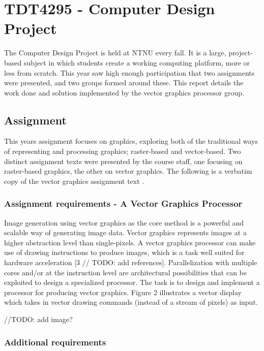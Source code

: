 \chapter{TDT4295 - Computer Design Project}
\label{sec:intro}

The Computer Design Project is held at NTNU every fall.
It is a large, project-based subject in which students create a working computing platform, more or less from scratch.
This year saw high enough participation that two assignments were presented, and two groups formed around these.
This report details the work done and solution implemented by the vector graphics processor group.

\section{Assignment}

This years assignment focuses on graphics, exploring both of the traditional ways of representing and processing graphics; raster-based and vector-based.
Two distinct assignment texts were presented by the course staff, one focusing on raster-based graphics, the other on vector graphics.
The following is a verbatim copy of the vector graphics assignment text \cite{assignment-text}.

\subsection{Assignment requirements - A Vector Graphics Processor}

Image generation using vector graphics as the core method is a powerful and scalable way of generating image data.
Vector graphics represents images at a higher abstraction level than single-pixels.
A vector graphics processor can make use of drawing instructions to produce images, which is a task well suited for hardware acceleration [3 // TODO: add references].
Parallelization with multiple cores and/or at the instruction level are architectural possibilities that can be exploited to design a specialized processor.
The task is to design and implement a processor for producing vector graphics.
Figure 2 illustrates a vector display which takes in vector drawing commands (instead of a stream of pixels) as input.

//TODO: add image?

\subsection{Additional requirements}

